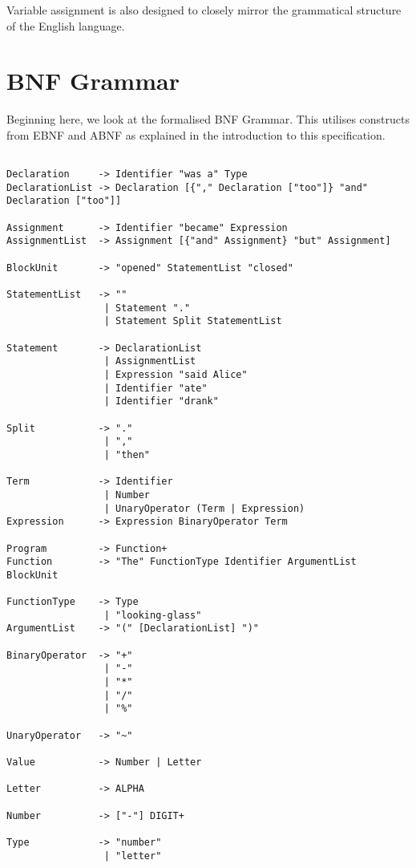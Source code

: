 \documentclass[a4wide, 11pt]{article}
\begin{document}
Variable assignment is also designed to closely mirror the grammatical structure of the English language.

\section{BNF Grammar} 

Beginning here, we look at the formalised BNF Grammar. This utilises constructs from EBNF and ABNF as explained in the introduction to this specification.

\begin{verbatim}

Declaration     -> Identifier "was a" Type
DeclarationList -> Declaration [{"," Declaration ["too"]} "and" Declaration ["too"]]

Assignment      -> Identifier "became" Expression
AssignmentList  -> Assignment [{"and" Assignment} "but" Assignment]

BlockUnit       -> "opened" StatementList "closed"

StatementList   -> ""
                 | Statement "."
                 | Statement Split StatementList
               
Statement       -> DeclarationList
                 | AssignmentList
                 | Expression "said Alice"
                 | Identifier "ate"
                 | Identifier "drank"

Split           -> "."
                 | ","
                 | "then"

Term            -> Identifier
                 | Number
                 | UnaryOperator (Term | Expression)
Expression      -> Expression BinaryOperator Term

Program         -> Function+
Function        -> "The" FunctionType Identifier ArgumentList BlockUnit

FunctionType    -> Type
                 | "looking-glass"
ArgumentList    -> "(" [DeclarationList] ")"

BinaryOperator  -> "+"
                 | "-"
                 | "*"
                 | "/" 
                 | "%"

UnaryOperator   -> "~" 

Value           -> Number | Letter

Letter          -> ALPHA

Number          -> ["-"] DIGIT+

Type            -> "number"
                 | "letter"

\end{verbatim}
\end{document}
